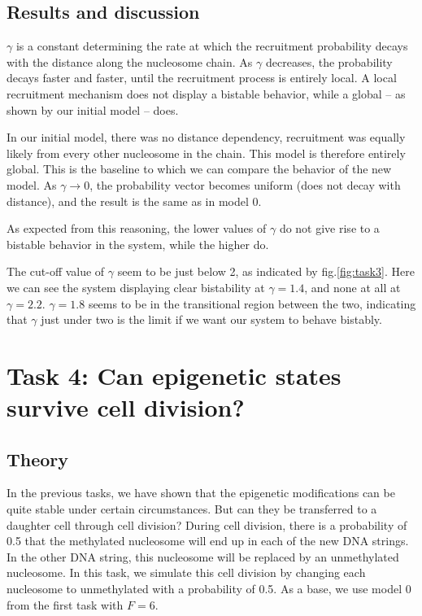 \documentclass[fleqn,10pt]{SelfArx} %
\begin{document}
\subsection{Results and discussion}



$\gamma$ is a constant determining the rate at which the recruitment probability decays with the distance along the nucleosome chain. As $\gamma$ decreases, the probability decays faster and faster, until the recruitment process is entirely local. A local recruitment mechanism does not display a bistable behavior, while a global -- as shown by our initial model -- does. 

In our initial model, there was no distance dependency, recruitment was equally likely from every other nucleosome in the chain. This model is therefore entirely global. 
This is the baseline to which we can compare the behavior of the new model. 
As $\gamma\to 0$, the probability vector becomes uniform (does not decay with distance), and the result is the same as in model 0.

As expected from this reasoning, the lower values of $\gamma$ do not give rise to a bistable behavior in the system, while the higher do. 

The cut-off value of $\gamma$ seem to be just below 2, as indicated by fig.\eqref{fig:task3}. 
Here we can see the system displaying clear bistability at $\gamma = 1.4$, and none at all at $\gamma= 2.2$. $\gamma= 1.8$ seems to be in the transitional region between the two, indicating that $\gamma$ just under two is the limit if we want our system to behave bistably. 








\section{Task 4: Can epigenetic states survive cell division?}
\subsection{Theory}
In the previous tasks, we have shown that the epigenetic modifications can be quite stable under certain circumstances. But can they be transferred to a daughter cell through cell division?
During cell division, there is a probability of 0.5 that the methylated nucleosome will end up in each of the new DNA strings. In the other DNA string, this nucleosome will be replaced by an unmethylated nucleosome. 
In this task, we simulate this cell division by changing each nucleosome to unmethylated with a probability of 0.5.
As a base, we use model 0 from the first task with $F=6$.
\end{document}
